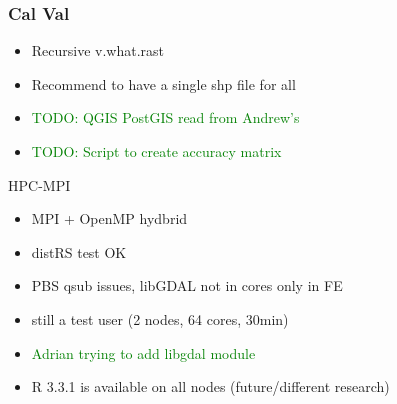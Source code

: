 \documentclass[serif,mathserif,aspectratio=169]{beamer}
\begin{document}

{
\begin{frame}[plain]
\end{frame}}


\begin{frame}
  \frametitle{Cal Val}
\begin{center}
\begin{itemize}
 \item Recursive v.what.rast
 \item Recommend to have a single shp file for all
 \item \textcolor{green}{TODO: QGIS PostGIS read from Andrew's}
 \item \textcolor{green}{TODO: Script to create accuracy matrix}
\end{itemize}
\end{center}
\end{frame}


{
\begin{frame}[plain]
\begin{shaded}
\Huge HPC-MPI
\end{shaded}
\end{frame}}


\begin{frame}
\begin{center}
\begin{itemize}
 \item MPI + OpenMP hydbrid
 \item distRS test OK
 \item PBS qsub issues, libGDAL not in cores only in FE 
 \item still a test user (2 nodes, 64 cores, 30min)
 \item \textcolor{green}{Adrian trying to add libgdal module}
 \item R 3.3.1 is available on all nodes (future/different research)
\end{itemize}
\end{center}
\end{frame}
\end{document}
